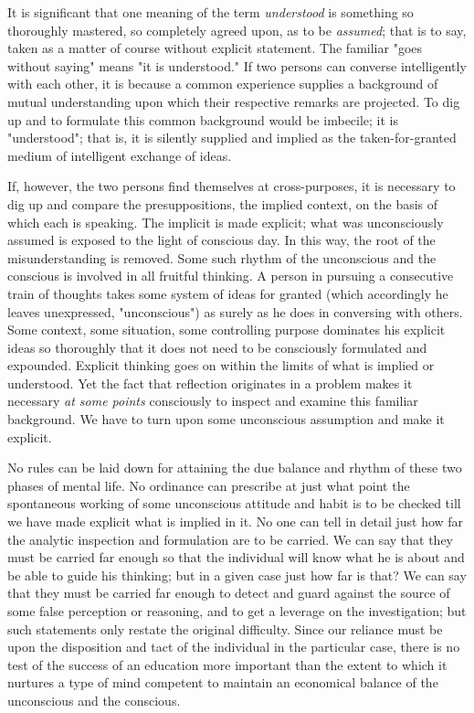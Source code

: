 \documentclass[showtrims,ustradepaper]{memoir}
\begin{document}

It is significant that one meaning of the term \emph{understood} is
something so thoroughly mastered, so completely agreed upon, as to be
\emph{assumed}; that is to say, taken as a matter of course without
explicit statement. The familiar "goes without saying" means "it is
understood." If two persons can converse intelligently with each other,
it is because a common experience supplies a background of mutual
understanding upon which their respective remarks are projected. To dig
up and to formulate this common background would be imbecile; it is
"understood"; that is, it is silently supplied and implied as the
taken-for-granted medium of intelligent exchange of ideas.


If, however, the two persons find themselves at cross-purposes, it is
necessary to dig up and compare the presuppositions, the implied
context, on the basis of which each is speaking. The implicit is made
explicit; what was unconsciously assumed is exposed to the light of
conscious day. In this way, the root of the
misunderstanding
is removed. Some such rhythm of the unconscious and the conscious is
involved in all fruitful thinking. A person in pursuing a consecutive
train of thoughts takes some system of ideas for granted (which
accordingly he leaves unexpressed, "unconscious") as surely as he does
in conversing with others. Some context, some situation, some
controlling purpose dominates his explicit ideas so thoroughly that it
does not need to be consciously formulated and expounded. Explicit
thinking goes on within the limits of what is implied or understood. Yet
the fact that reflection originates in a problem makes it necessary
\emph{at some points} consciously to inspect and examine this familiar
background. We have to turn upon some unconscious assumption and make it
explicit.


No rules can be laid down for attaining the due balance and rhythm of
these two phases of mental life. No ordinance can prescribe at just what
point the spontaneous working of some unconscious attitude and habit is
to be checked till we have made explicit what is implied in it. No one
can tell in detail just how far the analytic inspection and formulation
are to be carried. We can say that they must be carried far enough so
that the individual will know what he is about and be able to guide his
thinking; but in a given case just how far is that? We can say that they
must be carried far enough to detect and guard against the source of
some false perception or reasoning, and to get a leverage on the
investigation; but such statements only restate the original difficulty.
Since our reliance must be upon the disposition and tact of the
individual in the particular case, there is no test of the success of an
education more important than the extent to which it nurtures a type of
mind competent
to
maintain an economical balance of the unconscious and the conscious.
\end{document}
